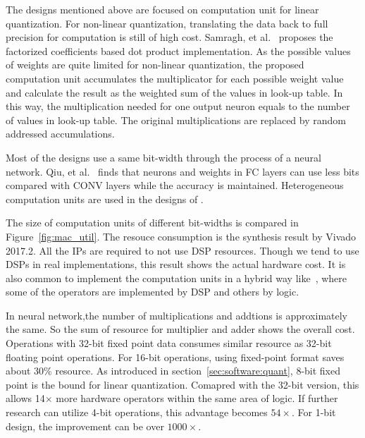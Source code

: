 The designs mentioned above are focused on computation unit for linear quantization. For non-linear quantization, translating the data back to full precision for computation is still of high cost. Samragh, et al.~\cite{samragh2017customizing} proposes the factorized coefficients based dot product implementation. As the possible values of weights are quite limited for non-linear quantization, the proposed computation unit accumulates the multiplicator for each possible weight value and calculate the result as the weighted sum of the values in look-up table. In this way, the multiplication needed for one output neuron equals to the number of values in look-up table. The original multiplications are replaced by random addressed accumulations.

Most of the designs use a same bit-width through the process of a neural network. Qiu, et al.~\cite{qiu2016going} finds that neurons and weights in FC layers can use less bits compared with CONV layers while the accuracy is maintained. Heterogeneous computation units are used in the designs of \cite{zhao2017accelerating, guo2017bit}.

The size of computation units of different bit-widths is compared in Figure~\ref{fig:mac_util}. The resouce consumption is the synthesis result by Vivado 2017.2. All the IPs are required to not use DSP resources. Though we tend to use DSPs in real implementations, this result shows the actual hardware cost. It is also common to implement the computation units in a hybrid way like~\cite{qiu2016going}, where some of the operators are implemented by DSP and others by logic.

In neural network,the number of multiplications and addtions is approximately the same. So the sum of resource for multiplier and adder shows the overall cost. Operations with 32-bit fixed point data consumes similar resource as 32-bit floating point operations. For 16-bit operations, using fixed-point format saves about 30\% resource. As introduced in section~\ref{sec:software:quant}, 8-bit fixed point is the bound for linear quantization. Comapred with the 32-bit version, this allows 14$\times$ more hardware operators within the same area of logic. If further research can utilize 4-bit operations, this advantage becomes $54\times$. For 1-bit design, the improvement can be over $1000\times$.

